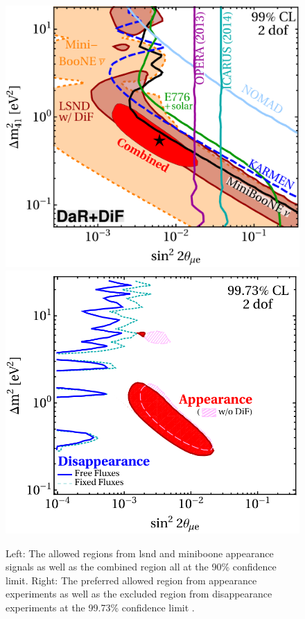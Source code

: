 \begin{figure}
    \centering
    \includegraphics[width = \smallfigwidth, height = 0.885\smallfigwidth]{figures-chap2/nue_app_combo.png}
    \includegraphics[width = \smallfigwidth, height = 0.9\smallfigwidth]{figures-chap2/preffered_exclusion_regions.png}
    \caption[Global analysis showing the allowed region from appearance experiments and the excluded region from disappearance experiments.]{Left: The allowed regions from \gls{lsnd} and \gls{miniboone} appearance signals as well as the combined region all at the 90\% confidence limit. Right: The preferred allowed region from appearance experiments as well as the excluded region from disappearance experiments at the 99.73\% confidence limit  \cite{LSND_KARMEN_nue_app_contour}.}
    \label{fig:allowed_exclusion_region_tension}
\end{figure}
